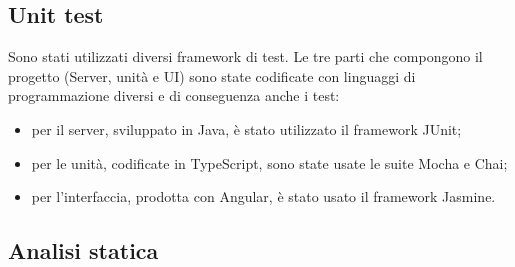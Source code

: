 \subsection{Unit test}
	Sono stati utilizzati diversi framework di test. Le tre parti che compongono il progetto (Server, unità e UI) sono state codificate con linguaggi di programmazione diversi e di conseguenza anche i test:
	\begin{itemize}
		\item per il server, sviluppato in Java, è stato utilizzato il framework JUnit;
		\item per le unità, codificate in TypeScript, sono state usate le suite Mocha e Chai;
		\item per l'interfaccia, prodotta con Angular, è stato usato il framework Jasmine.
	\end{itemize}
	
\subsection{Analisi statica}
	